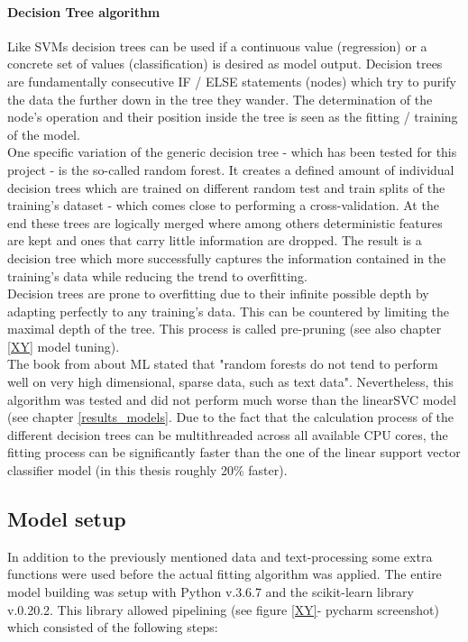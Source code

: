 \paragraph{Decision Tree algorithm}
Like SVMs decision trees can be used if a continuous value (regression) or a concrete set of values (classification) is desired as model output. Decision trees are fundamentally consecutive IF / ELSE statements (nodes) which try to purify the data the further down in the tree they wander. The determination of the node's operation and their position inside the tree is seen as the fitting / training of the model.\\
One specific variation of the generic decision tree - which has been tested for this project - is the so-called random forest. It creates a defined amount of individual decision trees which are trained on different random test and train splits of the training's dataset - which comes close to performing a cross-validation. At the end these trees are logically merged where among others deterministic features are kept and ones that carry little information are dropped. The result is a decision tree which more successfully captures the information contained in the training's data while reducing the trend to overfitting.\\
Decision trees are prone to overfitting due to their infinite possible depth by adapting perfectly to any training's data. This can be countered by limiting the maximal depth of the tree. This process is called pre-pruning (see also chapter \ref{XY} model tuning).\\
\newline
 The book from \parencite{Guido2016} about ML stated that "random forests do not tend to perform well on very high dimensional, sparse data, such as text data". Nevertheless, this algorithm was tested and did not perform much worse than the linearSVC model (see chapter \ref{results_models}. Due to the fact that the calculation process of the different decision trees can be multithreaded across all available CPU cores, the fitting process can be significantly faster than the one of the linear support vector classifier model (in this thesis roughly 20\% faster). 

\subsection{Model setup} \label{model_setup}
In addition to the previously mentioned data and text-processing some extra functions were used before the actual fitting algorithm was applied. The entire model building was setup with Python v.3.6.7 and the scikit-learn library v.0.20.2. This library allowed pipelining (see figure \ref{XY}- pycharm screenshot) which consisted of the following steps:

